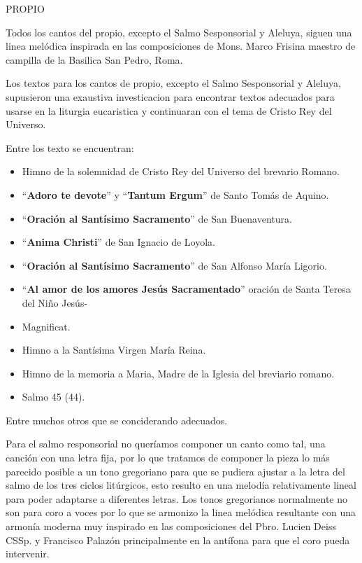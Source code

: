 \documentclass[12pt, letterpaper]{report}
\begin{document}
    {\large PROPIO}

    Todos los cantos del propio, excepto el Salmo Sesponsorial y Aleluya, siguen una linea mel\'odica inspirada en las composiciones de Mons. Marco Frisina maestro de campilla de la Basilica San Pedro, Roma.

    Los textos para los cantos de propio, excepto el Salmo Sesponsorial y Aleluya, supusieron una exaustiva investicacion para encontrar textos adecuados para usarse en la liturgia eucaristica y continuaran con el tema de Cristo Rey del Universo.

    Entre los texto se encuentran:

    \begin{itemize}
      \item Himno de la solemnidad de Cristo Rey del Universo del brevario Romano.
      \item ``\textbf{Adoro te devote}'' y ``\textbf{Tantum Ergum}'' de Santo Tom\'as de Aquino.
      \item ``\textbf{Oraci\'on al Sant\'isimo Sacramento}'' de San Buenaventura.
      \item ``\textbf{Anima Christi}'' de San Ignacio de Loyola.
      \item ``\textbf{Oraci\'on al Sant\'isimo Sacramento}'' de San Alfonso Mar\'ia Ligorio.
      \item ``\textbf{Al amor de los amores Jes\'us Sacramentado}'' oraci\'on de Santa Teresa del Ni\~no Jes\'us-
      \item Magnificat.
      \item Himno a la Sant\'isima Virgen Mar\'ia Reina.
      \item Himno de la memoria a Maria, Madre de la Iglesia del breviario romano.
      \item Salmo 45 (44).
    \end{itemize}

    Entre muchos otros que se conciderando adecuados.

    Para el salmo responsorial no quer\'iamos componer un canto como tal, una canci\'on con una letra fija, por lo que tratamos de componer la pieza lo m\'as parecido posible a un tono gregoriano para que se pudiera ajustar a la letra del salmo de
    los tres ciclos lit\'urgicos, esto resulto en una melod\'ia relativamente lineal para poder adaptarse a diferentes letras. Los tonos gregorianos normalmente no son para coro a voces por lo que se armonizo la linea mel\'odica resultante con una armon\'ia moderna muy inspirado en las composiciones del Pbro. Lucien Deiss CSSp. y Francisco Palaz\'on principalmente en la ant\'ifona para que el coro pueda intervenir.
\end{document}
